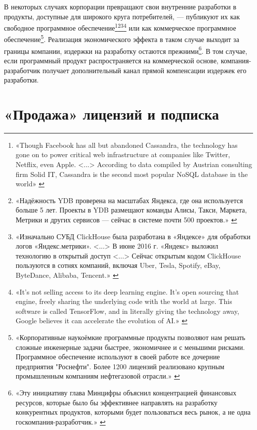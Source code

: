 \documentclass{article}
\begin{document}
В некоторых случаях корпорации превращают свои внутренние разработки в продукты, доступные для широкого круга потребителей, — публикуют их как свободное программное обеспечение\footnote{«Though Facebook has all but abandoned Cassandra, the technology has gone on to power critical web infrastructure at companies like Twitter, Netflix, even Apple. <...> According to data compiled by Austrian consulting firm Solid IT, Cassandra is the second most popular NoSQL database in the world» \cite{facebookCassandra}}\footnote{«Надёжность YDB проверена на масштабах Яндекса, где она используется больше 5 лет. Проекты в YDB размещают команды Алисы, Такси, Маркета, Метрики и других сервисов — сейчас в системе почти 500 проектов.» \cite{yandexYDB}}\footnote{«Изначально СУБД ClickHouse была разработана в «Яндексе» для обработки логов «Яндекс.метрики». <...> В июне 2016 г. «Яндекс» выложил технологию в открытый доступ <...> Сейчас открытым кодом ClickHouse пользуются в сотнях компаний, включая Uber, Tesla, Spotify, eBay, ByteDance, Alibaba, Tencent.» \cite{yandexClickHouse}}\footnote{«It's not selling access to its deep learning engine. It's open sourcing that engine, freely sharing the underlying code with the world at large. This software is called TensorFlow, and in literally giving the technology away, Google believes it can accelerate the evolution of AI.» \cite{googleTensorFlow}} или как коммерческое программное обеспечение\footnote{«Корпоративные наукоёмкие программные продукты позволяют нам решать сложные инженерные задачи быстрее, экономичнее и с меньшими рисками. Программное обеспечение используют в своей работе все дочерние предприятия "Роснефти". Более 1200 лицензий реализовано крупным промышленным компаниям нефтегазовой отрасли.» \cite{rosneftSoft}}. Реализация экономического эффекта в таком случае выходит за границы компании, издержки на разработку остаются прежними\footnote{«Эту инициативу глава Минцифры объяснил концентрацией финансовых ресурсов, которые было бы эффективнее направлять на разработку конкурентных продуктов, которыми будет пользоваться весь рынок, а не одна госкомпания-разработчик.» \cite{mintcifriForbidInhouseSoft}}. В том случае, если программный продукт распространяется на коммерческой основе, компания-разработчик получает дополнительный канал прямой компенсации издержек его разработки.

\section*{«Продажа» лицензий и подписка}
\end{document}
